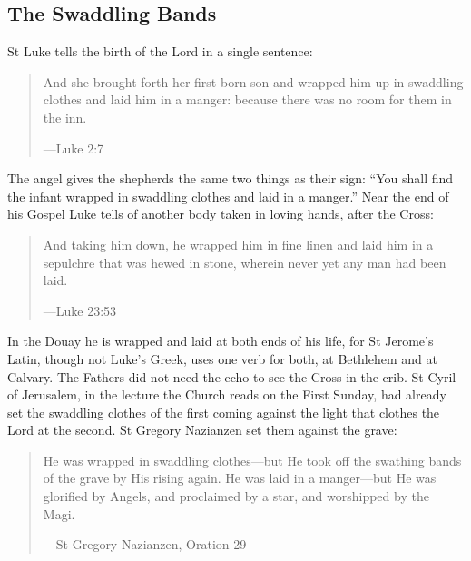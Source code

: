 \subsection{The Swaddling Bands}\label{sec:swaddling}

St Luke tells the birth of the Lord in a single sentence:

\begin{quote}
And she brought forth her first born son and wrapped him up in swaddling clothes
and laid him in a manger: because there was no room for them in the inn.\par
{\smallskip\noindent\small ---Luke 2:7\par}
\end{quote}

\noindent The angel gives the shepherds the same two things as their sign: ``You
shall find the infant wrapped in swaddling clothes and laid in a manger.'' Near
the end of his Gospel Luke tells of another body taken in loving hands, after
the Cross:

\begin{quote}
And taking him down, he wrapped him in fine linen and laid him in a sepulchre
that was hewed in stone, wherein never yet any man had been laid.\par
{\smallskip\noindent\small ---Luke 23:53\par}
\end{quote}

\noindent In the Douay he is wrapped and laid at both ends of his life, for St
Jerome's Latin, though not Luke's Greek, uses one verb for both,
 at Bethlehem and  at
Calvary. The Fathers did not need the echo to see the Cross in the crib. St Cyril of Jerusalem, in the lecture the
Church reads on the First Sunday, had already set the swaddling clothes of the
first coming against the light that clothes the Lord at the second. St Gregory
Nazianzen set them against the grave:

\begin{quote}
He was wrapped in swaddling clothes---but He took off the swathing bands of the
grave by His rising again. He was laid in a manger---but He was glorified by
Angels, and proclaimed by a star, and worshipped by the Magi.\par
{\smallskip\noindent\small ---St Gregory Nazianzen, Oration 29\par}
\end{quote}

